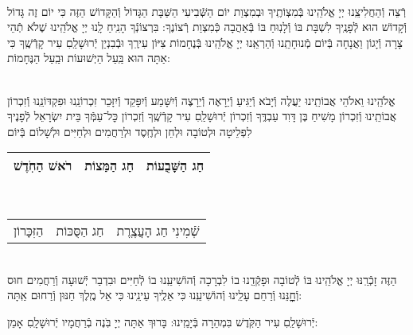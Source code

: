 \documentclass[twoside, openany, parskip=half, 11pt]{book}
\begin{document}
\vspace{-.25\baselineskip}
\begin{sometimes}

\shabbos\\
רְֿצֵה וְֿהַחֲלִיצֵֽנוּ יְיָ אֱלֹהֵֽינוּ בְּֿמִצְוֹתֶֽיךָ וּבְמִצְוַת יוֹם הַשְּֿׁבִיעִי הַשַּׁבָּת הַגָּדוֹל וְֿהַקָּדוֹשׁ הַזֶּה כִּי יוֹם זֶה גָּדוֹל וְֿקָדוֹשׁ הוּא לְֿפָנֶֽיךָ לִשְׁבָּת בּוֹ וְֿלָנֽוּחַ בּוֹ בְּֿאַהֲבָה כְּֿמִצְוַת רְֿצוֹנֶךָ: בִּרְצוֹנְֿךָ הָנִֽיחַ לָֽנוּ יְיָ אֱלֹהֵֽינוּ שֶׁלֹא תְֿהֵי צָרָה וְֿיָגוֹן וַאֲנָחָה בְּֿיוֹם מְֿנוּחָתֵֽנוּ וְֿהַרְאֵֽנוּ יְיָ אֱלֹהֵֽינוּ בְּֿנֶחָמוֹת צִיּוֹן עִירֶֽךָ וּבְֿבִנְיַן יְֿרוּשָׁלַֽםִ עִיר קָדְֿשֶֽׁךָ כִּי אַתָּה הוּא בַּֽעַל הַיְשׁוּעוֹת וּבַֽעַל הַנֶּחָמוֹת:


\sepline %

\vspace{-.25\baselineskip}
\\
אֱלֹהֵֽינוּ וֵאלֹהֵי אֲבוֹתֵֽינוּ יַעֲלֶה וְֿיָבֹא וְֿיַגִּיעַ וְֿיֵרָאֶה וְֿיֵרָצֶה וְֿיִשָּׁמַע וְֿיִפָּקֵד וְֿיִזָּכֵר זִכְרוֹנֵֽנוּ וּפִקְדּוֹנֵֽנוּ וְֿזִכְרוֹן אֲבוֹתֵֽינוּ וְֿזִכְרוֹן מָשִׁיחַ בֶּן דָּוִד עַבְדֶּֽךָ וְֿזִכְרוֹן יְֿרוּשָׁלַֽםִ עִיר קָדְֿשֶֽׁךָ וְֿזִכְרוֹן כׇּל־עַמְּֿךָ בֵּית יִשְׂרָאֵל לְֿפָנֶיךָ לִפְלֵיטָה וּלְטוֹבָה וּלְחֵן וּלְחֶֽסֶד וּלְרַחֲמִים וּלְחַיִּים וּלְשָׁלוֹם בְּֿיוֹם\\
\begin{tabular}{c|c|c}
רֹאשׁ הַחֹֽדֶשׁ & חַג הַמַּצוֹת & חַג הַשָּׁבֻעוֹת\\ \hline
\end{tabular}\\
\begin{tabular}{c|c|c}
הַזִּכָּרוֹן & חַג הַסֻּכּוֹת & שְֿׁמִינִי חַג הָעֲצֶֽרֶת
\end{tabular}\\
הַזֶּה זָכְֿרֵֽנּוּ יְיָ אֱלֹהֵֽינוּ בּוֹ לְֿטוֹבָה וּפָקְֿדֵֽנוּ בוֹ לִבְרָכָה וְֿהוֹשִׁיעֵֽנוּ בוֹ לְֿחַיִּים וּבִדְבַר יְֿשׁוּעָה וְֿרַחֲמִים חוּס וְֿחׇׇׇׇׇׇָנֵּנוּ וְֿרַחֵם עָלֵֽינוּ וְֿהוֹשִׁיעֵֽנוּ כִּי אֵלֶֽיךָ עֵינֵֽינוּ כִּי אֵל מֶֽלֶךְ חַנּוּן וְֿרַחוּם אַֽתָּה:

\end{sometimes}

יְֿרוּשָׁלַֽםִ עִיר הַקֹּֽדֶשׁ בִּמְהֵרָה בְּֿיָמֵֽינוּ: בָּרוּךְ אַתָּה יְיָ בֹּֽנֶה בְֿרַחֲמָיו יְֿרוּשָׁלָֽםִ אָמֵן:
\end{document}
